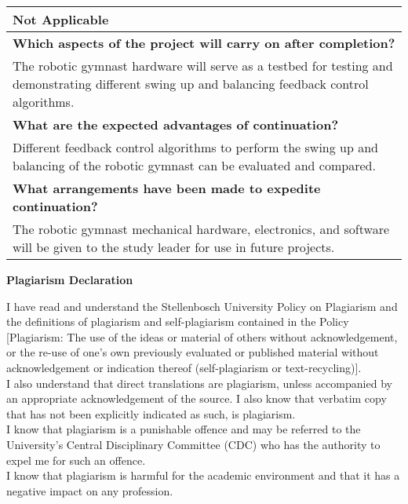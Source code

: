 \begin{table}[!h]
\begin{tabular}{|P{15cm}|}
			\hline 
			Not Applicable \\
			\hline 
			\textbf{Which aspects of the project will carry on after completion?} \\
			\hline
			The robotic gymnast hardware will serve as a testbed for testing and demonstrating different swing up and balancing feedback control algorithms. \\
			\hline 
			\textbf{What are the expected advantages of continuation?} \\
			\hline 
			Different feedback control algorithms to perform the swing up and balancing of the robotic gymnast can be evaluated and compared. \\
			\hline 
			\textbf{What arrangements have been made to expedite continuation?} \\
			\hline 
			The robotic gymnast mechanical hardware, electronics, and software will be given to the study leader for use in future projects. \\
			\hline
			
			
			
			
			
		\end{tabular}
	\end{table}
\newpage
\begin{center}
	\textbf{\Large Plagiarism Declaration}
\end{center}

I have read and understand the Stellenbosch University Policy on Plagiarism and the definitions of plagiarism and self-plagiarism contained in the Policy [Plagiarism: The use of the ideas or material of others without acknowledgement, or the re-use of one's own previously evaluated or published material without acknowledgement or indication thereof (self-plagiarism or text-recycling)].\\

I also understand that direct translations are plagiarism, unless accompanied by an appropriate acknowledgement of the source. I also know that verbatim copy that has not been explicitly indicated as such, is plagiarism.\\

I know that plagiarism is a punishable offence and may be referred to the University's Central Disciplinary Committee (CDC) who has the authority to expel me for such an offence.\\

I know that plagiarism is harmful for the academic environment and that it has a negative impact on any profession.\\

